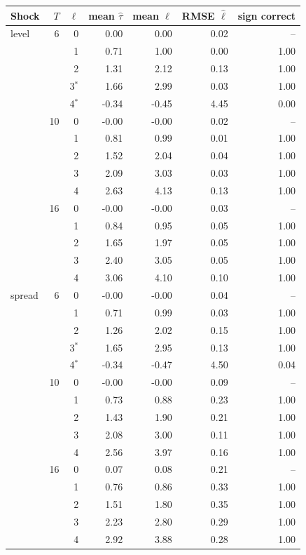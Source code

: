 \begin{tabular}{lrrrrrr}
\toprule
Shock & $T$ & $\ell$ & mean $\hat\tau$ & mean $\hat\ell$ & RMSE $\hat\ell$ & sign correct\\
\midrule
level & 6 & 0 & 0.00 & 0.00 & 0.02 & --\\
 &  & 1 & 0.71 & 1.00 & 0.00 & 1.00\\
 &  & 2 & 1.31 & 2.12 & 0.13 & 1.00\\
 &  & 3$^\ast$ & 1.66 & 2.99 & 0.03 & 1.00\\
 &  & 4$^\ast$ & -0.34 & -0.45 & 4.45 & 0.00\\
\addlinespace
 & 10 & 0 & -0.00 & -0.00 & 0.02 & --\\
 &  & 1 & 0.81 & 0.99 & 0.01 & 1.00\\
 &  & 2 & 1.52 & 2.04 & 0.04 & 1.00\\
 &  & 3 & 2.09 & 3.03 & 0.03 & 1.00\\
 &  & 4 & 2.63 & 4.13 & 0.13 & 1.00\\
\addlinespace
 & 16 & 0 & -0.00 & -0.00 & 0.03 & --\\
 &  & 1 & 0.84 & 0.95 & 0.05 & 1.00\\
 &  & 2 & 1.65 & 1.97 & 0.05 & 1.00\\
 &  & 3 & 2.40 & 3.05 & 0.05 & 1.00\\
 &  & 4 & 3.06 & 4.10 & 0.10 & 1.00\\
\addlinespace
spread & 6 & 0 & -0.00 & -0.00 & 0.04 & --\\
 &  & 1 & 0.71 & 0.99 & 0.03 & 1.00\\
 &  & 2 & 1.26 & 2.02 & 0.15 & 1.00\\
 &  & 3$^\ast$ & 1.65 & 2.95 & 0.13 & 1.00\\
 &  & 4$^\ast$ & -0.34 & -0.47 & 4.50 & 0.04\\
\addlinespace
 & 10 & 0 & -0.00 & -0.00 & 0.09 & --\\
 &  & 1 & 0.73 & 0.88 & 0.23 & 1.00\\
 &  & 2 & 1.43 & 1.90 & 0.21 & 1.00\\
 &  & 3 & 2.08 & 3.00 & 0.11 & 1.00\\
 &  & 4 & 2.56 & 3.97 & 0.16 & 1.00\\
\addlinespace
 & 16 & 0 & 0.07 & 0.08 & 0.21 & --\\
 &  & 1 & 0.76 & 0.86 & 0.33 & 1.00\\
 &  & 2 & 1.51 & 1.80 & 0.35 & 1.00\\
 &  & 3 & 2.23 & 2.80 & 0.29 & 1.00\\
 &  & 4 & 2.92 & 3.88 & 0.28 & 1.00\\
\bottomrule
\end{tabular}
